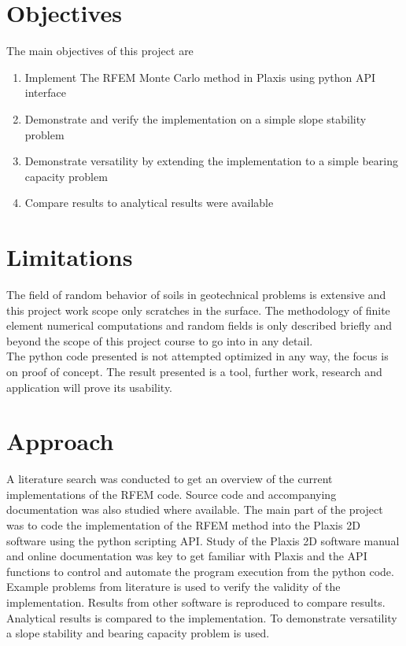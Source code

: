 \section{Objectives}
The main objectives of this project are
\begin{enumerate}
\item Implement The RFEM Monte Carlo method in Plaxis using python API interface
\item Demonstrate and verify the implementation on a simple slope stability problem
\item Demonstrate versatility by extending the implementation to a simple bearing capacity problem
\item Compare results to analytical results were available
\end{enumerate}


\section{Limitations}
The field of random behavior of soils in geotechnical problems is extensive and this project work scope only scratches in the surface. The methodology of finite element numerical computations and random fields is only described briefly and beyond the scope of this project course to go into in any detail.\\

The python code presented is not attempted optimized in any way, the focus is on proof of concept. The result presented is a tool, further work, research and application will prove its usability.

\section{Approach}
A literature search was conducted to get an overview of the current implementations of the RFEM code. Source code and accompanying documentation was also studied where available. The main part of the project was to code the implementation of the RFEM method into the Plaxis 2D software using the python scripting API. Study of the Plaxis 2D software manual and online documentation was key to get familiar with Plaxis and the API functions to control and automate the program execution from the python code. Example problems from literature is used to verify the validity of the implementation. Results from other software is reproduced to compare results.
Analytical results is compared to the implementation.
To demonstrate versatility a slope stability and bearing capacity problem is used.



